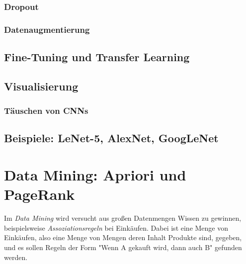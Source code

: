 		\subsection{Dropout} %

		\subsection{Datenaugmentierung} %

	\section{Fine-Tuning und Transfer Learning} %

	\section{Visualisierung} %

		\subsection{Täuschen von CNNs} %

	\section{Beispiele: LeNet-5, AlexNet, GoogLeNet} %

\chapter{Data Mining: Apriori und PageRank}
	Im \emph{Data Mining} wird versucht aus großen Datenmengen Wissen zu gewinnen, beispielsweise \emph{Assoziationsregeln} bei Einkäufen. Dabei ist eine Menge von Einkäufen, also eine Menge von Mengen deren Inhalt Produkte sind, gegeben, und es sollen Regeln der Form "Wenn A gekauft wird, dann auch B" gefunden werden.

